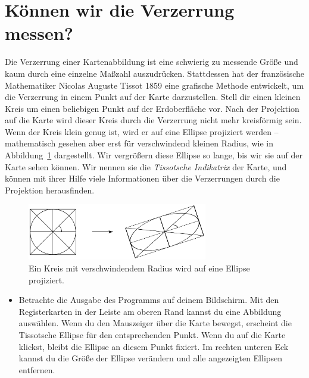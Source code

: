 \documentclass[a4paper,12pt]{article}
\begin{document}
\newpage
\section{Können wir die Verzerrung messen?}
\label{sec-distortion}

Die Verzerrung einer Kartenabbildung ist eine schwierig zu messende Größe und kaum 
durch eine einzelne Maßzahl auszudrücken. Stattdessen hat der französische Mathematiker
Nicolas Auguste Tissot 1859 eine grafische Methode entwickelt, um die Verzerrung in 
einem Punkt auf der Karte darzustellen. Stell dir einen kleinen Kreis um einen beliebigen 
Punkt auf der Erdoberfläche vor. Nach der Projektion auf die Karte wird dieser Kreis 
durch die Verzerrung nicht mehr kreisförmig sein. Wenn der Kreis klein genug ist, wird
er auf eine Ellipse projiziert werden -- mathematisch gesehen aber erst für verschwindend 
kleinen Radius, wie in Abbildung~\ref{tiss_diagram} dargestellt. Wir vergrößern 
diese Ellipse so lange, bis wir sie auf der Karte sehen können. Wir nennen sie die 
\emph{Tissotsche Indikatrix} der Karte, und können mit ihrer Hilfe viele Informationen 
über die Verzerrungen durch die Projektion herausfinden.

\begin{figure}[h]
 \begin{center}
  \includegraphics[width=0.7\textwidth]{../common/tiss_diagram} 
\caption{Ein Kreis mit verschwindendem Radius wird auf eine Ellipse projiziert.}
\label{tiss_diagram}
 \end{center}
\end{figure}

\begin{itemize}
 \item Betrachte die Ausgabe des Programms auf deinem Bildschirm. Mit den Registerkarten
       in der Leiste am oberen Rand kannst du eine Abbildung auswählen. Wenn du den
       Mauszeiger über die Karte bewegst, erscheint die Tissotsche Ellipse für den
       entsprechenden Punkt. Wenn du auf die Karte klickst, bleibt die Ellipse an 
       diesem Punkt fixiert. Im rechten unteren Eck kannst du die Größe der Ellipse
       verändern und alle angezeigten Ellipsen entfernen.
\end{itemize}
\end{document}
